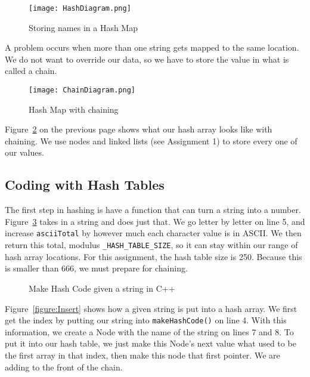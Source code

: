 \documentclass[letterpaper, 10pt,DIV=13]{scrartcl}
\numberwithin{equation}{section} %
\numberwithin{figure}{section} %
\numberwithin{table}{section} %
\begin{document}
\begin{figure}[ht] 
    \centering 
    \texttt{[image: HashDiagram.png]}
    \caption{Storing names in a Hash Map\footnotemark}
    \label{figure:HashDiagram}
    
\end{figure}

A problem occurs when more than one string gets mapped to the same location. We do not want to override our data, so we have to store the value in what is called a chain. 

\begin{figure}[ht] 
    \centering 
    \texttt{[image: ChainDiagram.png]}
    \caption{Hash Map with chaining\footnotemark}
    \label{figure:ChainDiagram}
    
\end{figure}




Figure~\ref{figure:ChainDiagram} on the previous page shows what our hash array looks like with chaining. We use nodes and linked lists (see Assignment 1) to store every one of our values.


\subsection{Coding with Hash Tables}
The first step in hashing is have a function that can turn a string into a number. Figure~\ref{figure:MakeHashCode} takes in a string and does just that. We go letter by letter on line 5, and increase \texttt{asciiTotal} by however much each character value is in ASCII. We then return this total, modulus \texttt{\_HASH\_TABLE\_SIZE}, so it can stay within our range of hash array locations. For this assignment, the hash table size is 250. Because this is smaller than 666, we must prepare for chaining.

\begin{figure}[ht] 
    \centering 
    
    \caption{Make Hash Code given a string in C++}
    \label{figure:MakeHashCode}
\end{figure}

Figure~\ref{figure:Insert} shows how a given string is put into a hash array. We first get the index by putting our string into \texttt{makeHashCode()} on line 4. With this information, we create a Node with the name of the string on lines 7 and 8. To put it into our hash table, we just make this Node's next value what used to be the first array in that index, then make this node that first pointer. We are adding to the front of the chain.
\end{document}
